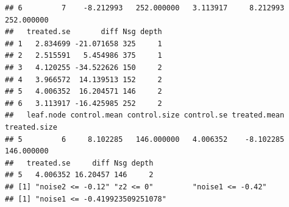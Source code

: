 \documentclass[smallextended]{svjour3}
\makeatletter
\newenvironment{kframe}{%
 \def\at@end@of@kframe{}%
 \ifinner\ifhmode%
  \def\at@end@of@kframe{\end{minipage}}%
  \begin{minipage}{\columnwidth}%
 \fi\fi%
 \def\FrameCommand##1{\hskip\@totalleftmargin \hskip-\fboxsep
 \colorbox{shadecolor}{##1}\hskip-\fboxsep
     \hskip-\linewidth \hskip-\@totalleftmargin \hskip\columnwidth}%
 \MakeFramed {\advance\hsize-\width
   \@totalleftmargin\z@ \linewidth\hsize
   \@setminipage}}%
 {\par\unskip\endMakeFramed%
 \at@end@of@kframe}
\newenvironment{knitrout}{}{} %
\makeatother
\begin{document}
\begin{knitrout}
\begin{kframe}
\begin{verbatim}
## 6         7    -8.212993   252.000000   3.113917     8.212993   252.000000
##   treated.se       diff Nsg depth
## 1   2.834699 -21.071658 325     1
## 2   2.515591   5.454986 375     1
## 3   4.120255 -34.522626 150     2
## 4   3.966572  14.139513 152     2
## 5   4.006352  16.204571 146     2
## 6   3.113917 -16.425985 252     2
##   leaf.node control.mean control.size control.se treated.mean treated.size
## 5         6     8.102285   146.000000   4.006352    -8.102285   146.000000
##   treated.se     diff Nsg depth
## 5   4.006352 16.20457 146     2
## [1] "noise2 <= -0.12" "z2 <= 0"         "noise1 <= -0.42"
## [1] "noise1 <= -0.419923509251078"
\end{verbatim}
\end{kframe}
\end{knitrout}
\end{document}
